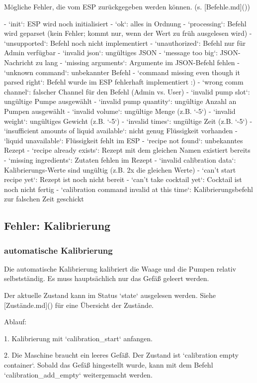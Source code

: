 Mögliche Fehler, die vom ESP zurückgegeben werden können. (s. [Befehle.md]())

- `init`: ESP wird noch initialisiert
- `ok`: alles in Ordnung
- `processing`: Befehl wird geparset (kein Fehler; kommt nur, wenn der Wert zu früh ausgelesen wird)
- `unsupported`: Befehl noch nicht implementiert
- `unauthorized`: Befehl nur für Admin verfügbar
- `invalid json`: ungültiges JSON
- `message too big`: JSON-Nachricht zu lang
- `missing arguments`: Argumente im JSON-Befehl fehlen
- `unknown command`: unbekannter Befehl
- `command missing even though it parsed right`: Befehl wurde im ESP fehlerhaft implementiert :)
- `wrong comm channel`: falscher Channel für den Befehl (Admin vs. User)
- `invalid pump slot`: ungültige Pumpe ausgewählt
- `invalid pump quantity`: ungültige Anzahl an Pumpen ausgewählt
- `invalid volume`: ungültige Menge (z.B. `-5`)
- `invalid weight`: ungültiges Gewicht (z.B. `-5`)
- `invalid times`: ungültige Zeit (z.B. `-5`)
- `insufficient amounts of liquid available`: nicht genug Flüssigkeit vorhanden
- `liquid unavailable`: Flüssigkeit fehlt im ESP
- `recipe not found`: unbekanntes Rezept
- `recipe already exists`: Rezept mit dem gleichen Namen existiert bereits
- `missing ingredients`: Zutaten fehlen im Rezept
- `invalid calibration data`: Kalibrierungs-Werte sind ungültig (z.B. 2x die gleichen Werte)
- `can't start recipe yet`: Rezept ist noch nicht bereit
- `can't take cocktail yet`: Cocktail ist noch nicht fertig
- `calibration command invalid at this time`: Kalibrierungsbefehl zur falschen Zeit geschickt

\subsection{Fehler: Kalibrierung}
\subsubsection{ automatische Kalibrierung}

Die automatische Kalibrierung kalibriert die Waage und die Pumpen relativ selbstständig. Es muss hauptsächlich nur das Gefäß geleert werden.

Der aktuelle Zustand kann im Status `state` ausgelesen werden. Siehe [Zustände.md]() für eine Übersicht der Zustände.

Ablauf:

1. Kalibrierung mit `calibration\_start` anfangen.

2. Die Maschine braucht ein leeres Gefäß. Der Zustand ist `calibration empty container`. Sobald das Gefäß hingestellt wurde, kann mit dem Befehl `calibration\_add\_empty` weitergemacht werden.

